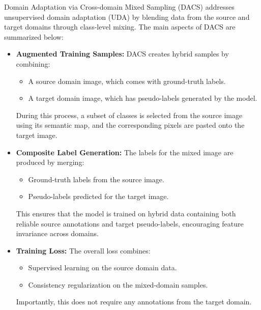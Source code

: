 \documentclass{article}
\begin{document}
\begin{multicols}{2}
	Domain Adaptation via Cross-domain Mixed Sampling (DACS) \cite{tranheden2021dacs} addresses unsupervised domain adaptation (UDA) by blending data from the source and target domains through class-level mixing. The main aspects of DACS are summarized below:
	
	\begin{itemize}
		\item \textbf{Augmented Training Samples:} 
		DACS creates hybrid samples by combining:
		\begin{itemize}
			\item A source domain image, which comes with ground-truth labels.
			\item A target domain image, which has pseudo-labels generated by the model.
		\end{itemize}
		During this process, a subset of classes is selected from the source image using its semantic map, and the corresponding pixels are pasted onto the target image.
		
		\item \textbf{Composite Label Generation:}
		The labels for the mixed image are produced by merging:
		\begin{itemize}
			\item Ground-truth labels from the source image.
			\item Pseudo-labels predicted for the target image.
		\end{itemize}
		This ensures that the model is trained on hybrid data containing both reliable source annotations and target pseudo-labels, encouraging feature invariance across domains.
		

		\item \textbf{Training Loss:} 
		The overall loss combines:
		\begin{itemize}
			\item Supervised learning on the source domain data.
			\item Consistency regularization on the mixed-domain samples.
		\end{itemize}
		Importantly, this does not require any annotations from the target domain.
		

	\end{itemize}
	
		

\end{multicols}
\end{document}
